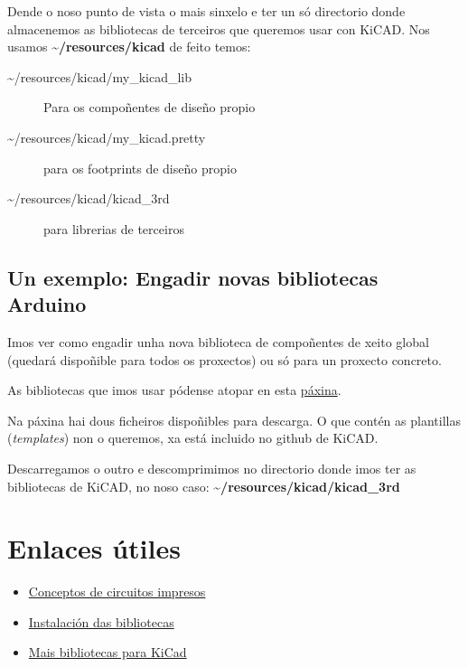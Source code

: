 \documentclass[12pt,galician,]{article}
\providecommand{\tightlist}{%
  \setlength{\itemsep}{0pt}\setlength{\parskip}{0pt}}
\begin{document}
Dende o noso punto de vista o mais sinxelo e ter un só directorio donde
almacenemos as bibliotecas de terceiros que queremos usar con KiCAD. Nos
usamos \textbf{\textasciitilde{}/resources/kicad} de feito temos:

\begin{description}
\item[\textasciitilde{}/resources/kicad/my\_kicad\_lib]
Para os compoñentes de diseño propio
\item[\textasciitilde{}/resources/kicad/my\_kicad.pretty]
para os footprints de diseño propio
\item[\textasciitilde{}/resources/kicad/kicad\_3rd]
para librerias de terceiros
\end{description}

\subsection{Un exemplo: Engadir novas bibliotecas
Arduino}\label{un-exemplo-engadir-novas-bibliotecas-arduino}

Imos ver como engadir unha nova biblioteca de compoñentes de xeito
global (quedará dispoñible para todos os proxectos) ou só para un
proxecto concreto.

As bibliotecas que imos usar pódense atopar en esta
\href{http://meta-blog.eklablog.com/kicad-librairie-arduino-pretty-p930786}{páxina}.

Na páxina hai dous ficheiros dispoñibles para descarga. O que contén as
plantillas (\emph{templates}) non o queremos, xa está incluido no github
de KiCAD.

Descarregamos o outro e descomprimimos no directorio donde imos ter as
bibliotecas de KiCAD, no noso caso:
\textbf{\textasciitilde{}/resources/kicad/kicad\_3rd}

\section{Enlaces útiles}\label{enlaces-uxfatiles}

\begin{itemize}
\tightlist
\item
  \href{http://www.pcb.electrosoft.cl/04-articulos-circuitos-impresos-desarrollo-sistemas/01-conceptos-circuitos-impresos/conceptos-circuitos-impresos-pcb.html}{Conceptos
  de circuitos impresos}
\item
  \href{http://www.arunet.co.uk/tkboyd/ele2pcbka.htm}{Instalación das
  bibliotecas}
\item
  \href{http://www.kicadlib.org/}{Mais bibliotecas para KiCad}
\end{itemize}
\end{document}
